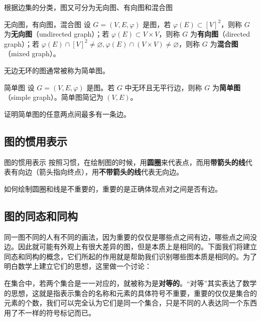 根据边集的分类，图又可分为无向图、有向图和混合图
\begin{definition}{无向图，有向图，混合图}
设 $G=(V,E,\varphi)$ 是图，若 $\varphi(E)\subset[V]^2$，则称 $G$ 为\textbf{无向图}（undirected graph）；若 $\varphi(E)\subset V\times V$，则称 $G$ 为\textbf{有向图}（directed graph）；若 $\varphi(E)\cap[V]^2\neq\varnothing,\varphi(E)\cap (V\times V)\neq\varnothing$，则称 $G$ 为\textbf{混合图}（mixed graph）。
\end{definition}

无边无环的图通常被称为简单图。
\begin{definition}{简单图}
设 $G=(V,E,\varphi)$ 是图。若 $G$ 中无环且无平行边，则称 $G$ 为\textbf{简单图}（simple graph）。简单图简记为 $(V,E)$。
\end{definition}
\begin{exercise}{}
证明简单图的任意两点间最多有一条边。
\end{exercise}


\subsection{图的惯用表示}

\begin{definition}{图的惯用表示}
按照习惯，在绘制图的时候，用\textbf{圆圈}来代表点，而用\textbf{带箭头的线}代表有向边（箭头指向终点），用\textbf{不带箭头的线}代表无向边。
\end{definition}
如何绘制圆圈和线是不重要的，重要的是正确体现点对之间是否有边。
\subsection{图的同态和同构}



同一图不同的人有不同的画法，因为重要的仅仅是哪些点之间有边，哪些点之间没边。因此就可能有外观上有很大差异的图，但是本质上是相同的。下面我们将建立同态和同构的概念，它们所起的作用就是帮助我们识别哪些图本质是相同的。为了明白数学上建立它们的思想，这里做一个讨论：

在集合中，若两个集合是一一对应的，就被称为是\textbf{对等的}。“对等”其实表达了数学的思想，这就是指表示集合的名称和元素的具体符号不重要，重要的仅仅是集合的元素的个数，我们可以完全认为它们是同一个集合，只是不同的人表达同一个东西用了不一样的符号标记而已。

